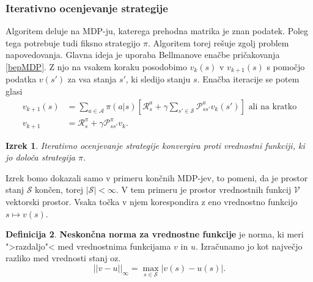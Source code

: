 \documentclass[12pt,a4paper]{amsart}
\theoremstyle{definition} %
\newtheorem{definicija}{Definicija}[section]
\theoremstyle{plain} %
\newtheorem{izrek}[definicija]{Izrek}
\begin{document}
\subsubsection{Iterativno ocenjevanje strategije}
Algoritem deluje na MDP-ju, katerega prehodna matrika je znan podatek. Poleg tega potrebuje tudi 
fiksno strategijo $\pi$. Algoritem torej rešuje zgolj problem napovedovanja. Glavna ideja je uporaba 
Bellmanove enačbe pričakovanja \eqref{bepMDP}. Z njo na vsakem koraku posodobimo $v_k(s)$ v 
$v_{k+1}(s)$ s pomočjo podatka $v(s')$ za vsa stanja $s'$, ki sledijo stanju $s$. Enačba iteracije se 
potem glasi 
\begin{align*}
    v_{k+1}(s) &= \sum_{a \in \mathcal{A}} \pi(a|s) \left[ \mathcal{R}_s^a + 
        \gamma \sum_{s' \in \mathcal{S}} \mathcal{P}_{ss'}^a v_k(s') \right] \text{ ali na kratko}\\
    v_{k+1} &= \mathcal{R}^\pi_s + \gamma \mathcal{P}^\pi_{ss'} v_k.
\end{align*}

\begin{izrek}\label{ios}
    Iterativno ocenjevanje strategije konvergira proti vrednostni funkciji, ki jo določa strategija 
    $\pi$.
\end{izrek}

Izrek bomo dokazali samo v primeru končnih MDP-jev, to pomeni, da je prostor stanj $\mathcal{S}$ 
končen, torej $|\mathcal{S}| < \infty$. V tem primeru je prostor vrednostnih funkcij $\mathcal{V}$
vektorski prostor. Vsaka točka v njem korespondira z eno vrednostno funkcijo $s \mapsto v(s)$.

\begin{definicija}
    \textbf{Neskončna norma za vrednostne funkcije} je norma, ki meri ">razdaljo"< med vrednostnima 
    funkcijama $v$ in $u$. Izračunamo jo kot največjo razliko med vrednosti stanj oz. 
    $$
    ||v - u||_\infty = \max_{s \in \mathcal{S}} |v(s) - u(s)|.
    $$
\end{definicija}
\end{document}
